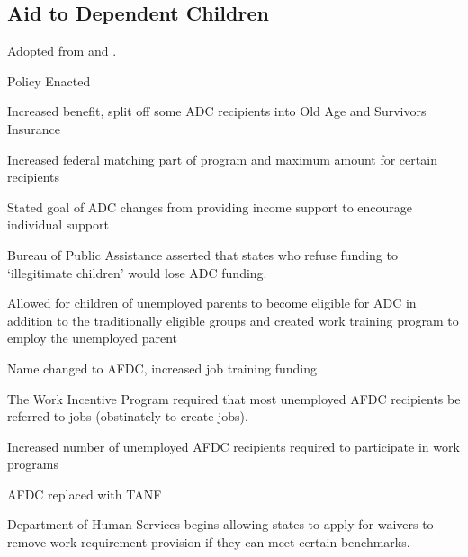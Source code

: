 \documentclass[12pt]{article}
\begin{document}
\subsection{Aid to Dependent Children}
Adopted from \citet[Appendixes A and B]{mittelstadt2005} and \citet{bell1965}.
\begin{description}
\setlength{\itemsep}{-5pt}
\item[1935] Policy Enacted
\item[1939] Increased benefit, split off some ADC recipients into Old Age and Survivors Insurance
\item[1952] Increased federal matching part of program and maximum amount for certain recipients
\item[1956] Stated goal of ADC changes from providing income support to encourage individual support
\item[1960] Bureau of Public Assistance asserted that states who refuse funding to `illegitimate children' would lose ADC funding.
\item[1961] Allowed for children of unemployed parents to become eligible for ADC in addition to the traditionally eligible groups and created work training program to employ the unemployed parent
\item[1962] Name changed to AFDC, increased job training funding
\item[1967] The Work Incentive Program required that most unemployed AFDC recipients be referred to jobs (obstinately to create jobs).
\item[1971] Increased number of unemployed AFDC recipients required to participate in work programs
\item[1996] AFDC replaced with TANF
\item[2012] Department of Human Services begins allowing states to apply for waivers to remove work requirement provision if they can meet certain benchmarks.
\end{description}


\end{document}
